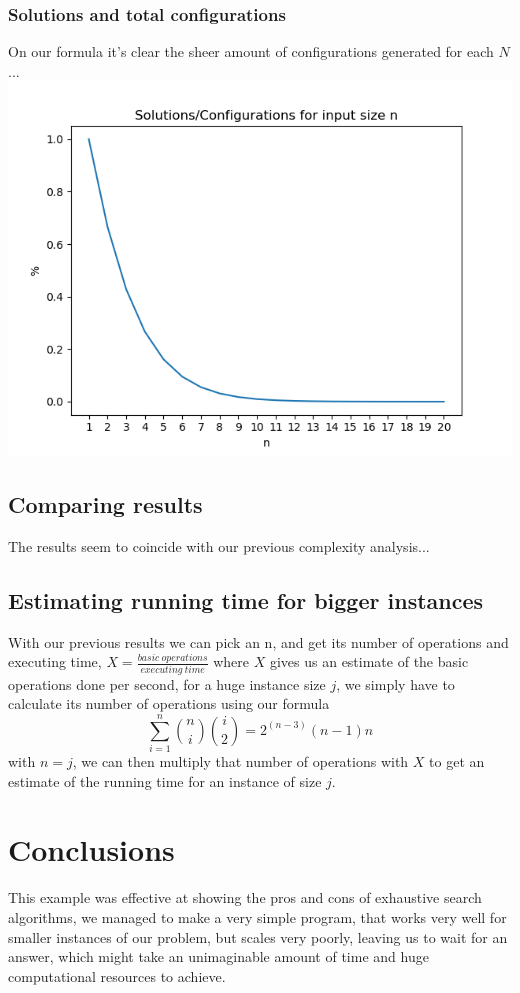 \documentclass[...]{revdetua}
\begin{document}
\subsubsection{Solutions and total configurations}
On our formula it's clear the sheer amount of configurations generated for each $N$...
\includegraphics[scale=0.5]{solconfig.png}
\subsection{Comparing results}
The results seem to coincide with our previous complexity analysis...
\subsection{Estimating running time for bigger instances}
With our previous results we can pick an n, and get its number of operations and executing time,  $X=\frac{basic\ operations}{executing\ time}$ where $X$ gives us an estimate of the basic operations done per second, for a huge instance size $j$, we simply have to calculate its number of operations using our formula $$\sum_{i=1}^{n}{{n}\choose{i}}{{i}\choose{2}}=2^{(n-3)}(n-1)n$$
with $n=j$, we can then multiply that number of operations with $X$ to get an estimate of the running time for an instance of size $j$.

\section{Conclusions}
This example was effective at showing the pros and cons of exhaustive search algorithms, we managed to make a very simple program, that works very well for smaller instances of our problem, but scales very poorly, leaving us to wait for an answer, which might take an unimaginable amount of time and huge computational resources to achieve.

\end{document}
